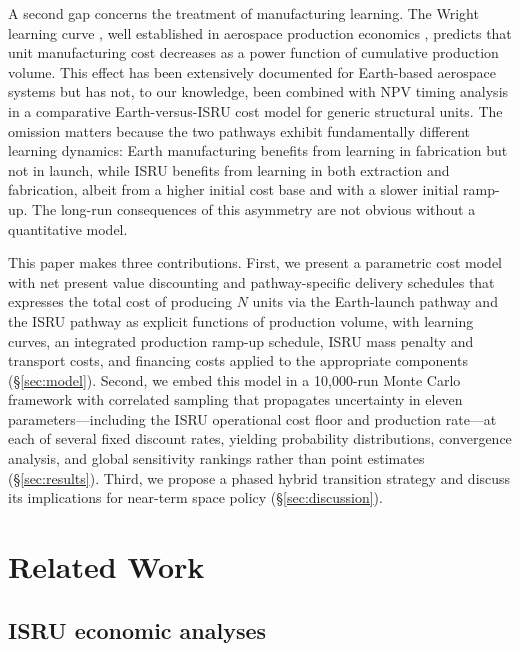 \documentclass[preprint,12pt]{elsarticle}
\begin{document}
A second gap concerns the treatment of manufacturing learning. The Wright learning curve \cite{wright1936}, well established in aerospace production economics \cite{wertz2011}, predicts that unit manufacturing cost decreases as a power function of cumulative production volume. This effect has been extensively documented for Earth-based aerospace systems \cite{argote1990,nagy2013} but has not, to our knowledge, been combined with NPV timing analysis in a comparative Earth-versus-ISRU cost model for generic structural units. The omission matters because the two pathways exhibit fundamentally different learning dynamics: Earth manufacturing benefits from learning in fabrication but not in launch, while ISRU benefits from learning in both extraction and fabrication, albeit from a higher initial cost base and with a slower initial ramp-up. The long-run consequences of this asymmetry are not obvious without a quantitative model.

This paper makes three contributions. First, we present a parametric cost model with net present value discounting and pathway-specific delivery schedules that expresses the total cost of producing $N$ units via the Earth-launch pathway and the ISRU pathway as explicit functions of production volume, with learning curves, an integrated production ramp-up schedule, ISRU mass penalty and transport costs, and financing costs applied to the appropriate components (\S\ref{sec:model}). Second, we embed this model in a 10{,}000-run Monte Carlo framework with correlated sampling that propagates uncertainty in eleven parameters---including the ISRU operational cost floor and production rate---at each of several fixed discount rates, yielding probability distributions, convergence analysis, and global sensitivity rankings rather than point estimates (\S\ref{sec:results}). Third, we propose a phased hybrid transition strategy and discuss its implications for near-term space policy (\S\ref{sec:discussion}).

\section{Related Work}
\label{sec:related}

\subsection{ISRU economic analyses}
\end{document}
